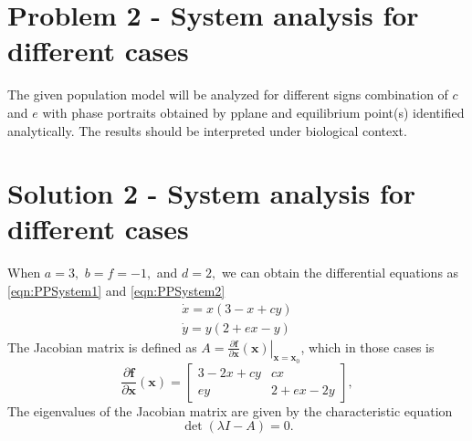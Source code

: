 \documentclass[a4paper,twocolumn]{article} %
\begin{document}
\section*{Problem 2 - System analysis for different cases}
\label{sec:prob2}

The given population model will be analyzed for different signs combination of $c$ and $e$ with phase portraits obtained by pplane and equilibrium point(s) identified analytically. The results should be interpreted under biological context. 

\section*{Solution 2 - System analysis for different cases}
\label{sec:solu2}

When $a=3,$ $b=f=-1,$ and $d=2,$ we can obtain the differential equations as  \eqref{eqn:PPSystem1} and \eqref{eqn:PPSystem2}
\begin{subequations}\label{eqn:PPSystem}
\begin{align}
    \dot{x} = x(3-x+cy) \label{eqn:PPSystem1} \\
    \dot{y} = y(2+ex-y) \label{eqn:PPSystem2}
\end{align}
\end{subequations}
The Jacobian matrix is defined as $A = \left. \frac{\partial\textbf{f}}{\partial \textbf{x}}(\textbf{x}) \right|_{\textbf{x}=\textbf{x}_0}$, which in those cases is
\begin{equation*}
    \frac{\partial\textbf{f}}{\partial \textbf{x}}(\textbf{x}) =
    \left[\begin{array}{cc}
    3-2x+cy & cx \\
    ey & 2+ex-2y
    \end{array}\right],
\end{equation*}
The eigenvalues of the Jacobian matrix are given by the characteristic equation
\begin{equation*}
    \det(\lambda I - A) = 0.
\end{equation*}
\end{document}
